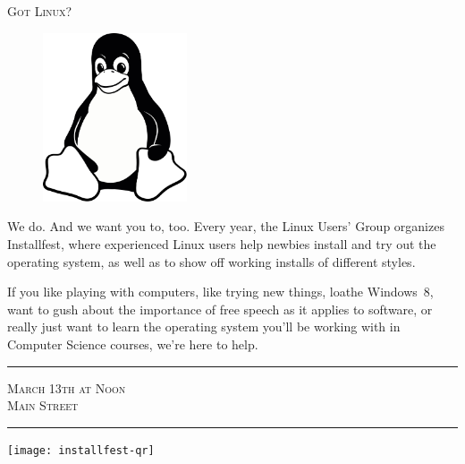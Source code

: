 \documentclass[12pt]{article}
\begin{document}
\pagestyle{empty}

\begin{center} \LARGE \scshape
    Got Linux?
\end{center}

\begin{figure}
    \vspace{-2em} %
    \begin{center}
        \includegraphics[width=0.38\textwidth]{tux-bw}
    \end{center}
    \vspace{-2em} %
\end{figure}

{\small

We do. And we want you to, too. Every year, the Linux Users' Group organizes
Installfest, where experienced Linux users help newbies install and try out the
operating system, as well as to show off working installs of different styles.

If you like playing with computers, like trying new things, loathe Windows~8,
want to gush about the importance of free speech as it applies to software, or
really just want to learn the operating system you'll be working with in
Computer Science courses, we're here to help.

}

\vfill

\begin{minipage}[bt]{0.58\textwidth}
    \begin{center}
        \hrule{}
        \vspace{1em}
        {\large \scshape
            March 13th at Noon\\
            Main Street
        }
        \vspace{1em}
        \hrule{}
    \end{center}
\end{minipage}
\begin{minipage}[bt]{0.38\textwidth}
    \begin{center}
        \texttt{[image: installfest-qr]}
    \end{center}
\end{minipage}
\end{document}
